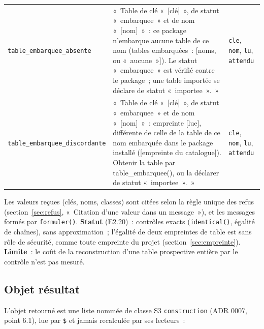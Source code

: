 \documentclass[a4paper,11pt]{article}
\newcommand{\code}[1]{\texttt{\small #1}}
\begin{document}
{\begin{longtable}{@{}p{5.2cm}p{6.0cm}p{3.4cm}@{}}
\code{table\_embarquee\_absente} & «~Table de clé «~[clé]~», de statut «~embarquee~» et de nom «~[nom]~»~: ce package n'embarque aucune table de ce nom (tables embarquées~: [noms, ou «~aucune~»]). Le statut «~embarquee~» est vérifié contre le package~; une table importée se déclare de statut «~importee~».~» & \code{cle}, \code{nom}, \code{lu}, \code{attendu} \\
\code{table\_embarquee\_discordante} & «~Table de clé «~[clé]~», de statut «~embarquee~» et de nom «~[nom]~»~: empreinte [lue], différente de celle de la table de ce nom embarquée dans le package installé ([empreinte du catalogue]). Obtenir la table par table\_embarquee(), ou la déclarer de statut «~importee~».~» & \code{cle}, \code{nom}, \code{lu}, \code{attendu} \\
\end{longtable}
}

\noindent
Les valeurs reçues (clés, noms, classes) sont citées selon la règle unique
des refus (section~\ref{sec:refus}, «~Citation d'une valeur dans un
message~»), et les messages formés par \code{formuler()}. \textbf{Statut}
(E2.20)~: contrôles exacts (\code{identical()}, égalité de chaînes),
sans approximation~; l'égalité de deux empreintes de table est sans rôle de
sécurité, comme toute empreinte du projet (section~\ref{sec:empreinte}).
\textbf{Limite}~: le coût de la reconstruction d'une table prospective
entière par le contrôle n'est pas mesuré.\par
\endgroup

\subsection{Objet résultat}
\label{sec:objet-resultat}

L'objet retourné est une liste nommée de classe S3 \code{construction}
(ADR 0007, point 6.1), lue par \code{\$} et jamais recalculée par ses
lecteurs~:
\end{document}
